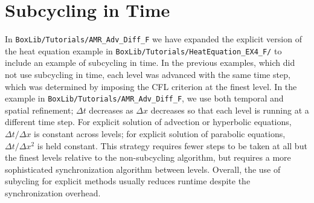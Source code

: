 \section{Subcycling in Time}\label{Sec:Subcycling}
In {\tt BoxLib/Tutorials/AMR\_Adv\_Diff\_F} we have expanded the
explicit version of the heat equation example in 
{\tt BoxLib/Tutorials/HeatEquation\_EX4\_F/} to include an example of
subcycling in time.  In the previous examples, which did not use
subcycling in time, each level was advanced with the same time step,
which was determined by imposing the CFL criterion at the finest
level.  In the example in {\tt BoxLib/Tutorials/AMR\_Adv\_Diff\_F},
we use both temporal and spatial refinement; 
$\Delta t$ decreases as $\Delta x$ decreases so
that each level is running at a different time step.  For explicit
solution of advection or hyperbolic equations, $\Delta t / \Delta x$
is constant across levels; for explicit solution of parabolic equations, 
$\Delta t / \Delta x^2$ is held constant.  This strategy
requires fewer steps to be taken at all but the finest levels relative
to the non-subcycling algorithm, but requires a more sophisticated
synchronization algorithm between levels.  Overall, the use of
subycling for explicit methods usually reduces runtime despite the
synchronization overhead.

